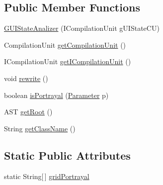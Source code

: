 \subsection*{Public Member Functions}
\begin{DoxyCompactItemize}
\item 
\hyperlink{classit_1_1isislab_1_1masonhelperdocumentation_1_1analizer_1_1_g_u_i_state_analizer_a202ef6dd6c5bfe313e8e05cd69c486e6}{G\-U\-I\-State\-Analizer} (I\-Compilation\-Unit g\-U\-I\-State\-C\-U)
\item 
Compilation\-Unit \hyperlink{classit_1_1isislab_1_1masonhelperdocumentation_1_1analizer_1_1_g_u_i_state_analizer_a4a7e6cd2352360259ec5a52e52c20df9}{get\-Compilation\-Unit} ()
\item 
I\-Compilation\-Unit \hyperlink{classit_1_1isislab_1_1masonhelperdocumentation_1_1analizer_1_1_g_u_i_state_analizer_a31513e5d8cc9ab9d5999472200fff490}{get\-I\-Compilation\-Unit} ()
\item 
void \hyperlink{classit_1_1isislab_1_1masonhelperdocumentation_1_1analizer_1_1_g_u_i_state_analizer_ade3afe629883da877a73f0a2527c4826}{rewrite} ()
\item 
boolean \hyperlink{classit_1_1isislab_1_1masonhelperdocumentation_1_1analizer_1_1_g_u_i_state_analizer_a3bb501fe8da4915f1e2b354b0f1023c0}{is\-Portrayal} (\hyperlink{classit_1_1isislab_1_1masonhelperdocumentation_1_1analizer_1_1_parameter}{Parameter} p)
\item 
A\-S\-T \hyperlink{classit_1_1isislab_1_1masonhelperdocumentation_1_1analizer_1_1_g_u_i_state_analizer_a9985fc94c40fd232df66a2f04e53a751}{get\-Root} ()
\item 
String \hyperlink{classit_1_1isislab_1_1masonhelperdocumentation_1_1analizer_1_1_g_u_i_state_analizer_af42352906ccbf3e667ee5f5a2c4bc97c}{get\-Class\-Name} ()
\end{DoxyCompactItemize}
\subsection*{Static Public Attributes}
\begin{DoxyCompactItemize}
\item 
static String\mbox{[}$\,$\mbox{]} \hyperlink{classit_1_1isislab_1_1masonhelperdocumentation_1_1analizer_1_1_g_u_i_state_analizer_ae38e62823b53316bca90fde444896897}{grid\-Portrayal}
\end{DoxyCompactItemize}
